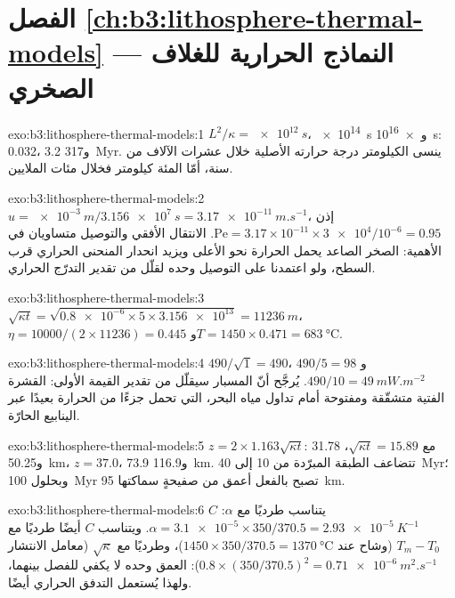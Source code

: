 \section*{الفصل \ref{ch:b3:lithosphere-thermal-models} --- النماذج الحرارية للغلاف الصخري}

\begin{solution}{exo:b3:lithosphere-thermal-models:1}
$L^2/\kappa = \qty{e12}{s}$، \qty{e14}{s} و\qty{e16}{s}: 0.032، 3.2
و\qty{317}{Myr}. ينسى الكيلومتر درجة حرارته الأصلية خلال عشرات الآلاف من
سنة، أمّا المئة كيلومتر فخلال مئات الملايين.
\end{solution}

\begin{solution}{exo:b3:lithosphere-thermal-models:2}
$u = \qty{e-3}{m}/\qty{3.156e7}{s} = \qty{3.17e-11}{m.s^{-1}}$، إذن
$\mathrm{Pe} = 3.17\times10^{-11}\times\num{3e4}/10^{-6} = 0.95$. الانتقال الأفقي
والتوصيل متساويان في الأهمية: الصخر الصاعد يحمل الحرارة نحو الأعلى
ويزيد انحدار المنحنى الحراري قرب السطح، ولو اعتمدنا على التوصيل وحده
لقلّل من تقدير التدرّج الحراري.
\end{solution}

\begin{solution}{exo:b3:lithosphere-thermal-models:3}
$\sqrt{\kappa t} = \sqrt{\num{0.8e-6}\times5\times\num{3.156e13}} =
\qty{11236}{m}$، $\eta = 10000/(2\times11236) = 0.445$ و$T = 1450\times0.471
= \qty{683}{\celsius}$.
\end{solution}

\begin{solution}{exo:b3:lithosphere-thermal-models:4}
$490/\sqrt1 = 490$، $490/5 = 98$ و$490/10 = \qty{49}{mW.m^{-2}}$. يُرجَّح أنّ المسبار
سيقلّل من تقدير القيمة الأولى: القشرة الفتية متشقّقة ومفتوحة أمام
تداول مياه البحر، التي تحمل جزءًا من الحرارة بعيدًا عبر الينابيع الحارّة.
\end{solution}

\begin{solution}{exo:b3:lithosphere-thermal-models:5}
$z = 2\times1.163\sqrt{\kappa t}$: مع $\sqrt{\kappa t} = 15.89$، 31.78
و\qty{50.25}{km}، $z = 37.0$، 73.9 و\qty{116.9}{km}. تتضاعف الطبقة المبرّدة
من 10 إلى \qty{40}{Myr}؛ وبحلول \qty{100}{Myr} تصبح بالفعل أعمق من
صفيحةٍ سماكتها \qty{95}{km}.
\end{solution}

\begin{solution}{exo:b3:lithosphere-thermal-models:6}
$C$ يتناسب طرديًا مع $\alpha$: $\alpha = \num{3.1e-5}\times350/370.5 =
\qty{2.93e-5}{K^{-1}}$. ويتناسب $C$ أيضًا طرديًا مع $T_m - T_0$ (وشاح عند
$1450\times350/370.5 = \qty{1370}{\celsius}$)، وطرديًا مع $\sqrt\kappa$ (معامل
الانتشار $0.8\times(350/370.5)^2 = \qty{0.71e-6}{m^2.s^{-1}}$): العمق وحده
لا يكفي للفصل بينهما، ولهذا يُستعمل التدفق الحراري أيضًا.
\end{solution}

